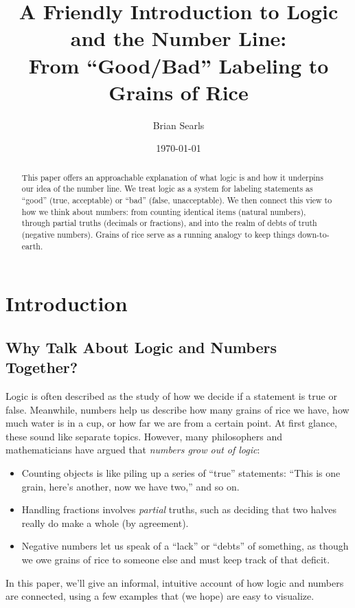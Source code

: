 \documentclass[12pt]{article}
\title{A Friendly Introduction to Logic and the Number Line:\\
From ``Good/Bad'' Labeling to Grains of Rice}
\author{Brian Searls}
\date{\today}
\begin{document}
\maketitle

\begin{abstract}
This paper offers an approachable explanation of what logic is and how
it underpins our idea of the number line. We treat logic as a system
for labeling statements as ``good'' (true, acceptable) or ``bad''
(false, unacceptable). We then connect this view to how we think about
numbers: from counting identical items (natural numbers), through
partial truths (decimals or fractions), and into the realm of debts
of truth (negative numbers). Grains of rice serve as a running analogy
to keep things down-to-earth.
\end{abstract}

\tableofcontents

\section{Introduction}
\label{sec:intro}

\subsection{Why Talk About Logic and Numbers Together?}
Logic is often described as the study of how we decide if a statement is
true or false. Meanwhile, numbers help us describe how many grains of rice
we have, how much water is in a cup, or how far we are from a certain point.
At first glance, these sound like separate topics. However, many philosophers
and mathematicians have argued that \emph{numbers grow out of logic}:
\begin{itemize}
  \item Counting objects is like piling up a series of ``true'' statements:
  ``This is one grain, here's another, now we have two,'' and so on.
  \item Handling fractions involves \emph{partial} truths, such as deciding
  that two halves really do make a whole (by agreement).
  \item Negative numbers let us speak of a ``lack'' or ``debts'' of something,
  as though we owe grains of rice to someone else and must keep track of that
  deficit.
\end{itemize}

In this paper, we'll give an informal, intuitive account of how logic and
numbers are connected, using a few examples that (we hope) are easy to visualize.
\end{document}
